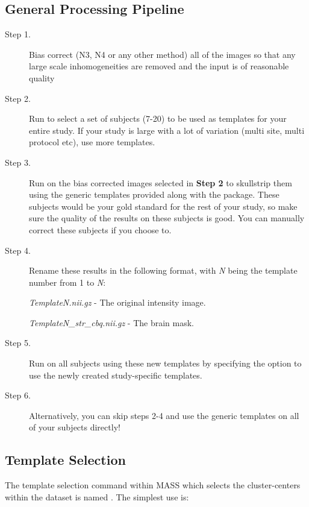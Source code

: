 \documentclass[letterpaper,10pt,english]{sphinxhowto}
\begin{document}
\subsection{General Processing Pipeline}
\label{manual:general-processing-pipeline}\begin{description}
\item[{Step 1.}] \leavevmode
Bias correct (N3, N4 or any other method) all of the images so that
any large scale inhomogeneities are removed and the input is of reasonable quality

\item[{Step 2.}] \leavevmode
Run  to select a set of subjects (7-20) to be used as templates
for your entire study. If your study is large with a lot of variation (multi site,
multi protocol etc), use more templates.

\item[{Step 3.}] \leavevmode
Run  on the bias corrected images selected in \textbf{Step 2} to skullstrip them using
the generic templates provided along with the package. These subjects would be your
gold standard for the rest of your study, so make sure the quality of the results on
these subjects is good. You can manually correct these subjects if you choose to.

\item[{Step 4.}] \leavevmode
Rename these results in the following format, with \emph{N} being the template number from 1 to \emph{N}:

\emph{TemplateN.nii.gz}           - The original intensity image.

\emph{TemplateN\_str\_cbq.nii.gz}   - The brain mask.

\item[{Step 5.}] \leavevmode
Run  on all subjects using these new templates by specifying the  option to use
the newly created study-specific templates.

\item[{Step 6.}] \leavevmode
Alternatively, you can skip steps 2-4 and use the generic templates on all of your subjects directly!

\end{description}


\subsection{Template Selection}
\label{manual:template-selection}
The template selection command within MASS which selects the cluster-centers within
the dataset is named . The simplest use is:
\end{document}
